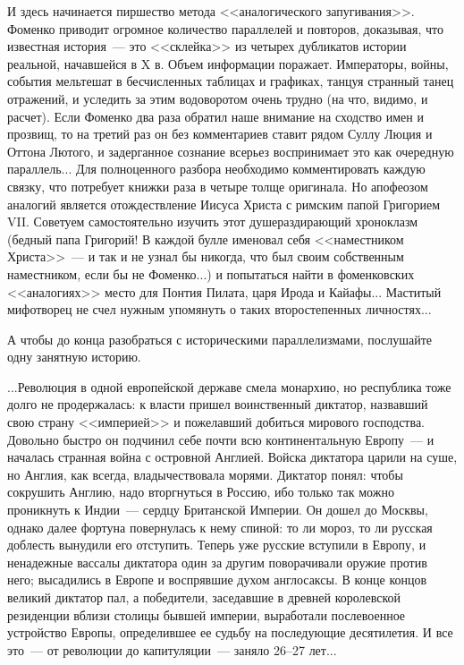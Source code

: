 \documentclass{scrbook}
\newcommand{\flqq}{<<}
\newcommand{\frqq}{>>}
\newcommand{\mdash}{~--- }
\newcommand{\ndash}{--}
\begin{document}
И здесь начинается пиршество метода {\flqq}аналогического запугивания{\frqq}. Фоменко приводит огромное количество параллелей и повторов, доказывая, что известная история{\mdash}это {\flqq}склейка{\frqq} из четырех дубликатов истории реальной, начавшейся в X в. Объем информации поражает. Императоры, войны, события мельтешат в бесчисленных таблицах и графиках, танцуя странный танец отражений, и уследить за этим водоворотом очень трудно (на что, видимо, и расчет). Если Фоменко два раза обратил наше внимание на сходство имен и прозвищ, то на третий раз он без комментариев ставит рядом Суллу Люция и Оттона Лютого, и задерганное сознание всерьез воспринимает это как очередную параллель... Для полноценного разбора необходимо комментировать каждую связку, что потребует книжки раза в четыре толще оригинала. Но апофеозом аналогий является отождествление Иисуса Христа с римским папой Григорием VII. Советуем самостоятельно изучить этот душераздирающий хроноклазм (бедный папа Григорий! В каждой булле именовал себя {\flqq}наместником Христа{\frqq}{\mdash}и так и не узнал бы никогда, что был своим собственным наместником, если бы не Фоменко...) и попытаться найти в фоменковских {\flqq}аналогиях{\frqq} место для Понтия Пилата, царя Ирода и Кайафы... Маститый мифотворец не счел нужным упомянуть о таких второстепенных личностях...

А чтобы до конца разобраться с историческими параллелизмами, послушайте одну занятную историю.

...Революция в одной европейской державе смела монархию, но республика тоже долго не продержалась: к власти пришел воинственный диктатор, назвавший свою страну {\flqq}империей{\frqq} и пожелавший добиться мирового господства. Довольно быстро он подчинил себе почти всю континентальную Европу{\mdash}и началась странная война с островной Англией. Войска диктатора царили на суше, но Англия, как всегда, владычествовала морями. Диктатор понял: чтобы сокрушить Англию, надо вторгнуться в Россию, ибо только так можно проникнуть к Индии{\mdash}сердцу Британской Империи. Он дошел до Москвы, однако далее фортуна повернулась к нему спиной: то ли мороз, то ли русская доблесть вынудили его отступить. Теперь уже русские вступили в Европу, и ненадежные вассалы диктатора один за другим поворачивали оружие против него; высадились в Европе и воспрявшие духом англосаксы. В конце концов великий диктатор пал, а победители, заседавшие в древней королевской резиденции вблизи столицы бывшей империи, выработали послевоенное устройство Европы, определившее ее судьбу на последующие десятилетия. И все это{\mdash}от революции до капитуляции{\mdash}заняло 26{\ndash}27 лет...
\end{document}
